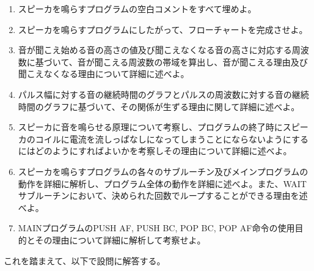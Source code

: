 \documentclass[11pt,a4j]{jsarticle}
\begin{document}
   \begin{enumerate}
   \item スピーカを鳴らすプログラムの空白コメントをすべて埋めよ。
   \item スピーカを鳴らすプログラムにしたがって、フローチャートを完成させよ。
   \item 音が聞こえ始める音の高さの値及び聞こえなくなる音の高さに対応する周波数に基づいて、音が聞こえる周波数の帯域を算出し、音が聞こえる理由及び聞こえなくなる理由について詳細に述べよ。
   \item パルス幅に対する音の継続時間のグラフとパルスの周波数に対する音の継続時間のグラフに基づいて、その関係が生ずる理由に関して詳細に述べよ。
   \item スピーカに音を鳴らせる原理について考察し、プログラムの終了時にスピーカのコイルに電流を流しっぱなしになってしまうことにならないようにするにはどのようにすればよいかを考察しその理由について詳細に述べよ。
   \item スピーカを鳴らすプログラムの各々のサブルーチン及びメインプログラムの動作を詳細に解析し、プログラム全体の動作を詳細に述べよ。また、WAITサブルーチンにおいて、決められた回数でループすることができる理由を述べよ。
   \item MAINプログラムのPUSH AF, PUSH BC, POP BC, POP AF命令の使用目的とその理由について詳細に解析して考察せよ。
   \end{enumerate}
   
   これを踏まえて、以下で設問に解答する。
   
\end{document}

